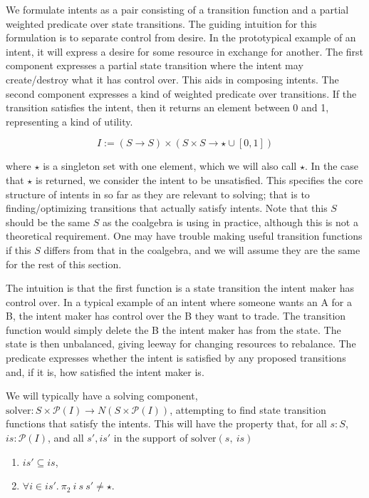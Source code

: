We formulate intents as a pair consisting of a transition function and a partial weighted predicate over state transitions. The guiding intuition for this formulation is to separate control from desire. In the prototypical example of an intent, it will express a desire for some resource in exchange for another. The first component expresses a partial state transition where the intent may create/destroy what it has control over. This aids in composing intents. The second component expresses a kind of weighted predicate over transitions. If the transition satisfies the intent, then it returns an element between 0 and 1, representing a kind of utility.

\begin{equation} \label{eq:intent}
    I := (S \rightarrow S) \times (S \times S \rightarrow \star \cup [0, 1])
\end{equation}

where $\star$ is a singleton set with one element, which we will also call $\star$. In the case that $\star$ is returned, we consider the intent to be unsatisfied. This specifies the core structure of intents in so far as they are relevant to solving; that is to finding/optimizing transitions that actually satisfy intents. Note that this $S$ should be the same $S$ as the coalgebra is using in practice, although this is not a theoretical requirement. One may have trouble making useful transition functions if this $S$ differs from that in the coalgebra, and we will assume they are the same for the rest of this section. 

The intuition is that the first function is a state transition the intent maker has control over. In a typical example of an intent where someone wants an A for a B, the intent maker has control over the B they want to trade. The transition function would simply delete the B the intent maker has from the state. The state is then unbalanced, giving leeway for changing resources to rebalance. The predicate expresses whether the intent is satisfied by any proposed transitions and, if it is, how satisfied the intent maker is.

We will typically have a solving component, $\text{solver} : S \times \mathcal{P}(I) \rightarrow N(S \times \mathcal{P}(I))$, attempting to find state transition functions that satisfy the intents. This will have the property that, for all $s : S$, $is : \mathcal{P}(I)$, and all $s', is'$ in the support of $\text{solver}(s,\ is)$

\begin{enumerate}
\item $is' \subseteq is$, 
\item $\forall i \in is'.\ \pi_2\ i\ s\ s' \neq \star$.
\end{enumerate}

